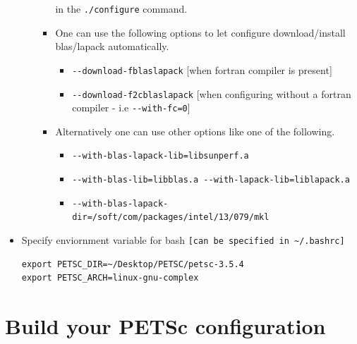 \documentclass{article}
\begin{document}
\begin{itemize}
\begin{itemize}
\begin{itemize}
in the \verb+./configure+ command.
\item One can use the following options to let configure download/install blas/lapack automatically.
\begin{itemize}
\item \verb+--download-fblaslapack+ [when fortran compiler is present]
\item \verb+--download-f2cblaslapack+ [when configuring without a fortran compiler - i.e \verb+--with-fc=0+]
\end{itemize} 
\item  Alternatively one can use other options like one of the following.
\begin{itemize}
\item \verb+--with-blas-lapack-lib=libsunperf.a+
\item \verb+--with-blas-lib=libblas.a --with-lapack-lib=liblapack.a+
\item \verb+--with-blas-lapack-dir=/soft/com/packages/intel/13/079/mkl+ 
\end{itemize}  
\end{itemize}
\end{itemize}
\item Specify enviornment variable for bash \verb+[can be specified in ~/.bashrc]+
\begin{verbatim}
export PETSC_DIR=~/Desktop/PETSC/petsc-3.5.4
export PETSC_ARCH=linux-gnu-complex
\end{verbatim}
\end{itemize}

\section{Build your PETSc configuration}
\end{document}

